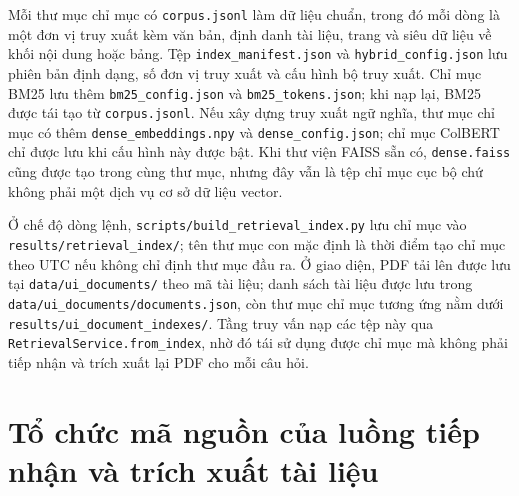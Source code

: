 \documentclass[../DoAn.tex]{subfiles}
\begin{document}
Mỗi thư mục chỉ mục có \texttt{corpus.jsonl} làm dữ liệu chuẩn, trong đó mỗi dòng
là một đơn vị truy xuất kèm văn bản, định danh tài liệu, trang và siêu dữ liệu về
khối nội dung hoặc bảng. Tệp \texttt{index\_manifest.json} và
\texttt{hybrid\_config.json} lưu phiên bản định dạng, số đơn vị truy xuất và cấu
hình bộ truy xuất. Chỉ mục BM25 lưu thêm \texttt{bm25\_config.json} và
\texttt{bm25\_tokens.json}; khi nạp lại, BM25 được tái tạo từ
\texttt{corpus.jsonl}. Nếu xây dựng truy xuất ngữ nghĩa, thư mục chỉ mục có thêm
\texttt{dense\_embeddings.npy} và \texttt{dense\_config.json}; chỉ mục ColBERT
chỉ được lưu khi cấu hình này được bật. Khi thư viện FAISS sẵn có,
\texttt{dense.faiss} cũng được tạo trong cùng thư mục, nhưng đây vẫn là tệp chỉ
mục cục bộ chứ không phải một dịch vụ cơ sở dữ liệu vector.

Ở chế độ dòng lệnh, \texttt{scripts/build\_retrieval\_index.py} lưu chỉ mục vào
\texttt{results/retrieval\_index/}; tên thư mục con mặc định là thời điểm tạo chỉ
mục theo UTC nếu không chỉ định thư mục đầu ra. Ở giao diện, PDF tải lên được lưu
tại \texttt{data/ui\_documents/} theo mã tài liệu; danh sách tài liệu được lưu
trong \texttt{data/ui\_documents/documents.json}, còn thư mục chỉ mục tương ứng
nằm dưới \texttt{results/ui\_document\_indexes/}. Tầng truy vấn nạp các tệp này
qua \texttt{RetrievalService.from\_index}, nhờ đó tái sử dụng được chỉ mục mà
không phải tiếp nhận và trích xuất lại PDF cho mỗi câu hỏi.

\section{Tổ chức mã nguồn của luồng tiếp nhận và trích xuất tài liệu}
\label{section:ingest-code-organization}
\end{document}
